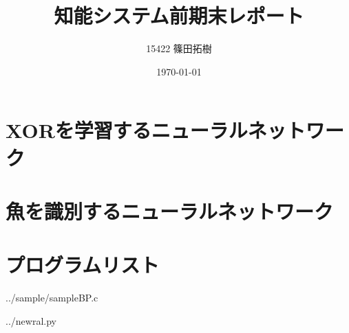 \documentclass {jsarticle}
\begin{document}
\title{知能システム前期末レポート}
\author{15422 篠田拓樹}
\date{\today}
\maketitle
\newpage
\section{XORを学習するニューラルネットワーク}
  
\section{魚を識別するニューラルネットワーク}
  
\newpage
\section{プログラムリスト}
\begin{multicols}{2}

{../sample/sampleBP.c}

{../newral.py}
\end{multicols}
\end{document}
